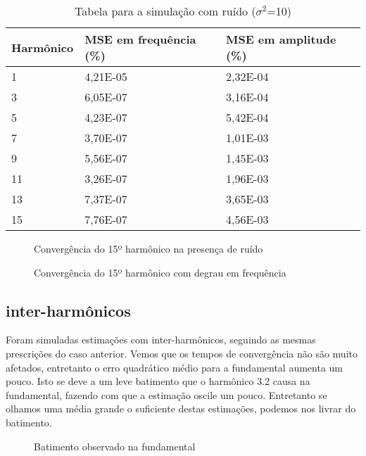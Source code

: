 \begin{table}[H]
	\centering
	\begin{tabular}{|p{2.5cm}|p{2.5cm}|p{2.5cm}|}
		\hline
		Harmônico & MSE em frequência (\%) & MSE em amplitude (\%)\\
		\hline
		1  & 4,21E-05 & 2,32E-04 \\
		3  & 6,05E-07 & 3,16E-04 \\
		5  & 4,23E-07 & 5,42E-04 \\
		7  & 3,70E-07 & 1,01E-03 \\
		9  & 5,56E-07 & 1,45E-03 \\
		11 & 3,26E-07 & 1,96E-03 \\
		13 & 7,37E-07 & 3,65E-03 \\
		15 & 7,76E-07 & 4,56E-03 \\
		\hline
	\end{tabular}
	\caption{Tabela para a simulação com ruído ($\sigma ^2$=10)}
\end{table}

\begin{figure}[H]
	\centering    
	\def\svgscale{1}
	
	\caption{Convergência do 15º harmônico na presença de ruído}
	\label{fig:esquema_pll}
\end{figure}

\begin{figure}[H]
	\centering    
	\def\svgscale{1}
	
	\caption{Convergência do 15º harmônico com degrau em frequência}
	\label{fig:esquema_pll}
\end{figure}

\subsection{inter-harmônicos}

Foram simuladas estimações com inter-harmônicos, seguindo as mesmas prescrições do caso anterior. Vemos que os tempos de convergência não são muito afetados, entretanto o erro quadrático médio para a fundamental aumenta um pouco. Isto se deve a um leve batimento que o harmônico 3.2 causa na fundamental, fazendo com que a estimação oscile um pouco. Entretanto se olhamos uma média grande o suficiente destas estimações, podemos nos livrar do batimento.

\begin{figure}[H]
	\centering    
	\def\svgscale{1}
	
	\caption{Batimento observado na fundamental}
	\label{fig:esquema_pll}
\end{figure}

